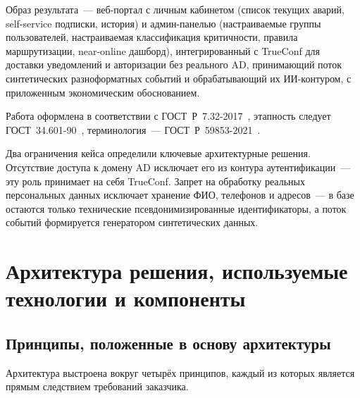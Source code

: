 \documentclass[utf8x, 12pt]{G7-32} %
\begin{document}
Образ результата~--- веб-портал с личным кабинетом (список текущих аварий,
self-service подписки, история) и админ-панелью (настраиваемые группы
пользователей, настраиваемая классификация критичности, правила маршрутизации,
near-online дашборд), интегрированный с TrueConf для доставки уведомлений и
авторизации без реального AD, принимающий поток синтетических разноформатных
событий и обрабатывающий их ИИ-контуром, с приложенным экономическим
обоснованием.

Работа оформлена в соответствии с ГОСТ~Р~7.32-2017~\cite{gost732}, этапность
следует ГОСТ~34.601-90~\cite{gost34601}, терминология~---
ГОСТ~Р~59853-2021~\cite{gost59853}.

Два ограничения кейса определили ключевые архитектурные решения.
Отсутствие доступа к домену AD исключает его из контура аутентификации~---
эту роль принимает на себя TrueConf.
Запрет на обработку реальных персональных данных исключает хранение ФИО,
телефонов и адресов~--- в базе остаются только технические
псевдонимизированные идентификаторы, а поток событий формируется генератором
синтетических данных.

\mainmatter


\chapter{Архитектура решения, используемые технологии и компоненты}

\section{Принципы, положенные в основу архитектуры}
Архитектура выстроена вокруг четырёх принципов, каждый из которых
является прямым следствием требований заказчика.
\end{document}
